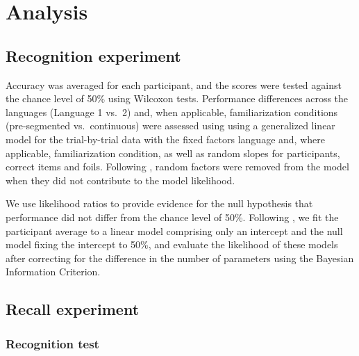 \documentclass[]{article}
\begin{document}
\section{Analysis}\label{analysis}

\subsection{Recognition experiment}\label{recognition-experiment}

Accuracy was averaged for each participant, and the scores were tested
against the chance level of 50\% using Wilcoxon tests. Performance
differences across the languages (Language 1 vs.~2) and, when
applicable, familiarization conditions (pre-segmented vs.~continuous)
were assessed using using a generalized linear model for the
trial-by-trial data with the fixed factors language and, where
applicable, familiarization condition, as well as random slopes for
participants, correct items and foils. Following \citep{Baayen2008},
random factors were removed from the model when they did not contribute
to the model likelihood.

We use likelihood ratios to provide evidence for the null hypothesis
that performance did not differ from the chance level of 50\%. Following
\citep{Glover2004}, we fit the participant average to a linear model
comprising only an intercept and the null model fixing the intercept to
50\%, and evaluate the likelihood of these models after correcting for
the difference in the number of parameters using the Bayesian
Information Criterion.

\subsection{Recall experiment}\label{recall-experiment-1}

\subsubsection{Recognition test}\label{recognition-test-1}
\end{document}
